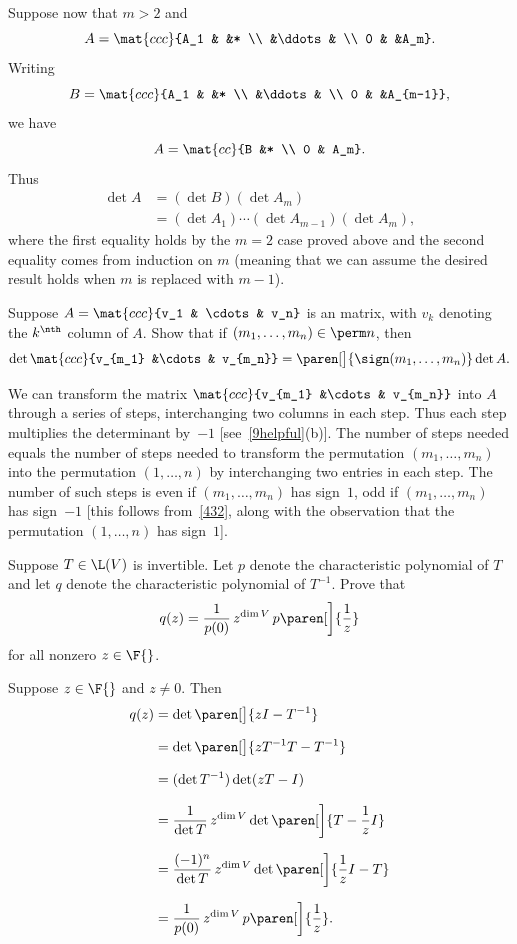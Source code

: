 \begin{Solution}
Suppose now that $m > 2$ and
\[
A = \mat{ccc}{A_1 & &* \\ &\ddots & \\ 0 & &A_m}.
\]
Writing
\[
B = \mat{ccc}{A_1 & &* \\ &\ddots & \\ 0 & &A_{m-1}},
\]
we have
\[
A = \mat{cc}{B &* \\ 0 & A_m}.
\]
Thus
\begin{align*}
\det A &= (\det B)(\det A_m) \\
&= (\det A_1) \dotsm (\det A_{m-1})(\det A_m),
\end{align*}
where the first equality holds by the $m = 2$ case proved above and the second
equality comes from induction on $m$ (meaning that we can assume the desired
result holds when $m$ is replaced with $m-1$).
\end{Solution}

\exercise
Suppose $A = \mat{ccc}{v_1 & \cdots & v_n}$ is an  matrix, with $v_k$ denoting the $k^\nth$ column of $A$. Show that if
$(m_1, \ldots, m_n) \in \perm n$, then
\[
\det \mat{ccc}{v_{m_1} &\cdots & v_{m_n}} = \paren[\big]{\sign(m_1, \ldots, m_n)} \det A.
\]
\exercisedisplayend

\begin{Solution}
We can transform the matrix $\mat{ccc}{v_{m_1} &\cdots & v_{m_n}}$ into $A$ through a series of steps, interchanging two columns in each step. Thus each step multiplies the determinant by~$-1$ [see~\ref{9helpful}(b)].  The number of steps needed equals the number of steps needed to transform the permutation $(m_1, \ldots, m_n)$ into the permutation $(1, \ldots, n)$ by interchanging two entries in each step.  The number of such steps is even if $(m_1, \ldots, m_n)$ has sign~$1$, odd if
$(m_1, \ldots, m_n)$ has sign~$-1$ [this follows from~\ref{432}, along with the observation that the permutation $(1, \ldots, n)$ has sign~$1$].
\end{Solution}

\exercise
Suppose $T \in \L(V)$ is invertible. Let $p$ denote the characteristic polynomial of $T$ and let $q$ denote the characteristic polynomial of $T^{-1}$. Prove that
\[
q(z) = \frac{1}{p(0)}\, z^{\dim V} \, p\paren[\bigg]{\frac{1}{z}}
\]
for all nonzero $z \in \F{}$.

\begin{Solution}
Suppose $z \in \F{}$ and $z \ne 0$. Then
\begin{align*}
q(z) &= \det\paren[\big]{zI - T^{-1}} \\[7bp]
&= \det \paren[\big]{ z T^{-1} T - T^{-1} }\\[7bp]
&= (\det T^{-1}) \det(zT - I) \\[7bp]
&= \frac{1}{\det T} \, z^{\dim V} \det \paren[\bigg]{ T - \frac{1}{z} I } \\[7bp]
&= \frac{(-1)^n}{\det T} \, z^{\dim V} \det \paren[\bigg]{ \frac{1}{z} I - T } \\[7bp]
&= \frac{1}{p(0)} \, z^{\dim V} \, p\paren[\bigg]{\frac{1}{z}}.
\end{align*}
\end{Solution}

